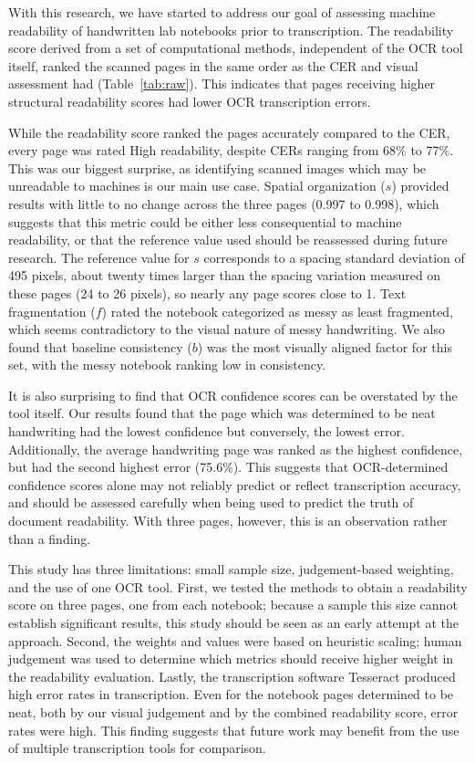 \documentclass[conference]{IEEEtran}
\begin{document}
With this research, we have started to address our goal of assessing machine
readability of handwritten lab notebooks prior to transcription. The
readability score derived from a set of computational methods, independent of
the OCR tool itself, ranked the scanned pages in the same order as the CER and
visual assessment had (Table~\ref{tab:raw}). This indicates that pages
receiving higher structural readability scores had lower OCR transcription
errors.

While the readability score ranked the pages accurately compared to the CER,
every page was rated High readability, despite CERs ranging from 68\% to 77\%.
This was our biggest surprise, as identifying scanned images which may be
unreadable to machines is our main use case. Spatial organization ($s$)
provided results with little to no change across the three pages (0.997 to
0.998), which suggests that this metric could be either less consequential to
machine readability, or that the reference value used should be reassessed
during future research.
The reference value for $s$ corresponds to a spacing standard deviation of 495
pixels, about twenty times larger than the spacing variation measured on these
pages (24 to 26 pixels), so nearly any page scores close to 1.
Text fragmentation ($f$) rated the notebook categorized as messy as least
fragmented, which seems contradictory to the visual nature of messy
handwriting. We also found that baseline consistency ($b$) was the most
visually aligned factor for this set, with the messy notebook ranking low in
consistency.

It is also surprising to find that OCR confidence scores can be overstated by
the tool itself. Our results found that the page which was determined to be
neat handwriting had the lowest confidence but conversely, the lowest error.
Additionally, the average handwriting page was ranked as the highest
confidence, but had the second highest error (75.6\%). This suggests that
OCR-determined confidence scores alone may not reliably predict or reflect
transcription accuracy, and should be assessed carefully when being used to
predict the truth of document readability.
With three pages, however, this is an observation rather than a finding.

This study has three limitations: small sample size, judgement-based weighting,
and the use of one OCR tool. First, we tested the methods to obtain a
readability score on three pages, one from each notebook; because a sample this
size cannot establish significant results, this study should be seen as an
early attempt at the approach. Second, the weights and values were based on
heuristic scaling; human judgement was used to determine which metrics should
receive higher weight in the readability evaluation. Lastly, the transcription
software Tesseract produced high error rates in transcription. Even for the
notebook pages determined to be neat, both by our visual judgement and by the
combined readability score, error rates were high. This finding suggests that
future work may benefit from the use of multiple transcription tools for
comparison.
\end{document}
